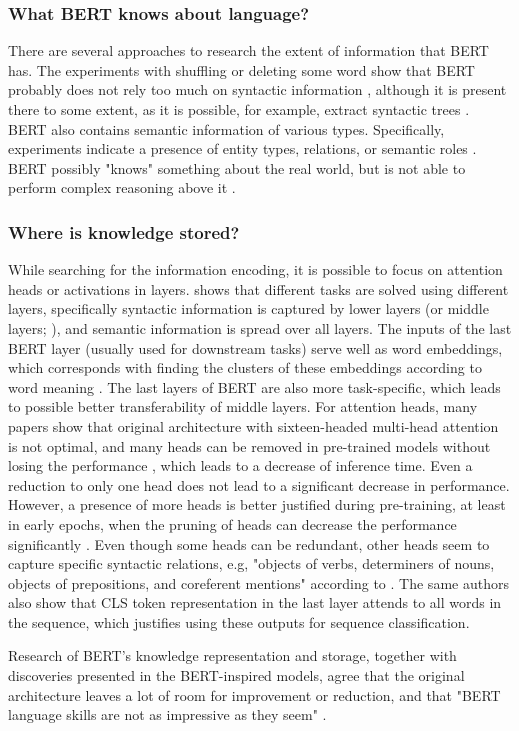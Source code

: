 \subsubsection{What BERT knows about language?}
There are several approaches to research the extent of information that BERT has. The experiments with shuffling or deleting some word show that BERT probably does not rely too much on syntactic information \citep{Ettinger2019, Rogers2020}, although it is present there to some extent, as it is possible, for example, extract syntactic trees \citep{Rosa2019}. BERT also contains semantic information of various types. Specifically, experiments indicate a presence of entity types, relations, or semantic roles \citep{Tenney2019a}. BERT possibly "knows" something about the real world, but is not able to perform complex reasoning above it \citep{Rogers2020}.

\subsubsection{Where is knowledge stored?}
While searching for the information encoding, it is possible to focus on attention heads or activations in layers.
\citet{Tenney2019} shows that different tasks are solved using different layers, specifically syntactic information is captured by lower layers (or middle layers; \citealp{Rogers2020}), and semantic information is spread over all layers. The inputs of the last BERT layer (usually used for downstream tasks) serve well as word embeddings, which corresponds with finding the clusters of these embeddings according to word meaning \citep{Rogers2020}. The last layers of BERT are also more task-specific, which leads to possible better transferability of middle layers. For attention heads, many papers show that original architecture with sixteen-headed multi-head attention is not optimal, and many heads can be removed in pre-trained models without losing the performance \citep{Michel2019}, which leads to a decrease of inference time. Even a reduction to only one head does not lead to a significant decrease in performance. However, a presence of more heads is better justified during pre-training, at least in early epochs, when the pruning of heads can decrease the performance significantly \citep{Michel2019}. Even though some heads can be redundant, other heads seem to capture specific syntactic relations, e.g, "objects of verbs, determiners of nouns, objects of prepositions, and coreferent mentions" according to \citet{Clark2019}. The same authors also show that CLS token representation in the last layer attends to all words in the sequence, which justifies using these outputs for sequence classification. 
\par
Research of BERT's knowledge representation and storage, together with discoveries presented in the BERT-inspired models, agree that the original architecture leaves a lot of room for improvement or reduction, and that "BERT language skills are not as impressive as they seem" \citep{Rogers2020}.

